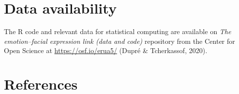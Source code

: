 \documentclass[
  english,
  man]{apa7}
\begin{document}
\hypertarget{data-availability}{%
\section{Data availability}\label{data-availability}}

The R code and relevant data for statistical computing are available on \emph{The emotion--facial expression link (data and code)} repository from the Center for Open Science at \url{https://osf.io/erua5/} (Dupré \& Tcherkassof, 2020).

\newpage

\hypertarget{references}{%
\section{References}\label{references}}

\begingroup
\setlength{\parindent}{-0.5in}
\setlength{\leftskip}{0.5in}
\end{document}

